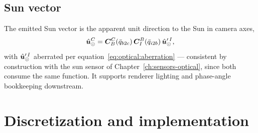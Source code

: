 \subsection{Sun vector}
\label{sec:camera:sun}

The emitted Sun vector is the apparent unit direction to the Sun in
camera axes,
\begin{equation}
  \hat{\bm{u}}_{\odot}^{C}
    = \bm{C}_{B}^{C}(\bar{q}_{b2c})\,\bm{C}_{I}^{B}(\bar{q}_{i2b})\,
      \hat{\bm{u}}'^{\,I}_{\odot},
  \label{eq:camera:sunvec}
\end{equation}
with $\hat{\bm{u}}'^{\,I}_{\odot}$ aberrated per
equation~\eqref{eq:optical:aberration} --- consistent by construction
with the sun sensor of Chapter~\ref{ch:sensors-optical}, since both
consume the same function. It supports renderer lighting and
phase-angle bookkeeping downstream.

\section{Discretization and implementation}
\label{sec:camera:implementation}

